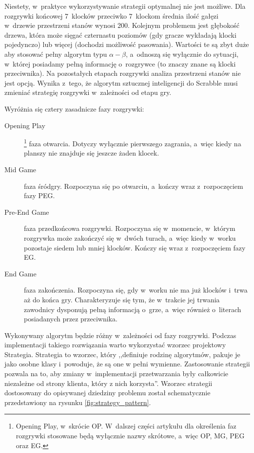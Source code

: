 \documentclass[a4paper,twocolumn,12pt]{article}
\theoremstyle{definition}
\begin{document}
Niestety, w~praktyce wykorzystywanie strategii optymalnej nie jest możliwe. Dla rozgrywki końcowej 7~klocków przeciwko 7~klockom średnia ilość gałęzi w~drzewie przestrzeni stanów wynosi 200. Kolejnym problemem jest głębokość drzewa, która może sięgać czternastu poziomów (gdy gracze wykładają klocki pojedynczo) lub więcej (dochodzi możliwość pasowania). Wartości te są zbyt duże aby stosować pełny algorytm typu $\alpha - \beta$, a~odnoszą się wyłącznie do sytuacji, w~której posiadamy pełną informację o~rozgrywce (to znaczy znane są klocki przeciwnika). Na pozostałych etapach rozgrywki analiza przestrzeni stanów nie jest opcją. Wynika z~tego, że algorytm sztucznej inteligencji do Scrabble musi zmieniać strategię rozgrywki w~zależności od etapu gry.

Wyróżnia się cztery zasadnicze fazy rozgrywki: \cite{sheppard_maven}

\begin{description}
	\item[Opening Play]\footnote{Opening Play, w~skrócie OP. W~dalszej części artykułu dla określenia faz rozgrywki stosowane będą wyłącznie nazwy skrótowe, a~więc OP, MG, PEG oraz EG.} faza otwarcia. Dotyczy wyłącznie pierwszego zagrania, a~więc kiedy na planszy nie znajduje się jeszcze żaden klocek.
	\item[Mid Game] faza śródgry. Rozpoczyna się po otwarciu, a~kończy wraz z~rozpoczęciem fazy PEG.
	\item[Pre-End Game] faza przedkońcowa rozgrywki. Rozpoczyna się w~momencie, w~którym rozgrywka może zakończyć się w~dwóch turach, a~więc kiedy w~worku pozostaje siedem lub mniej klocków. Kończy się wraz z~rozpoczęciem fazy EG.
	\item[End Game] faza zakończenia. Rozpoczyna się, gdy w~worku nie ma już klocków i~trwa aż do końca gry. Charakteryzuje się tym, że w~trakcie jej trwania zawodnicy dysponują pełną informacją o~grze, a~więc również o~literach posiadanych przez przeciwnika.
\end{description}

Wykonywany algorytm będzie różny w~zależności od fazy rozgrywki. Podczas implementacji takiego rozwiązania warto wykorzystać wzorzec projektowy Strategia. Strategia to wzorzec, który ,,definiuje rodzinę algorytmów, pakuje je jako osobne klasy i~powoduje, że są one w pełni wymienne. Zastosowanie strategii pozwala na to, aby zmiany w~implementacji przetwarzania były całkowicie niezależne od strony klienta, który z nich korzysta''. \cite{strategy_pattern_definition} Wzorzec strategii dostosowany do opisywanej dziedziny problemu został schematycznie przedstawiony na rysunku \ref{fig:strategy_pattern}.
\end{document}
